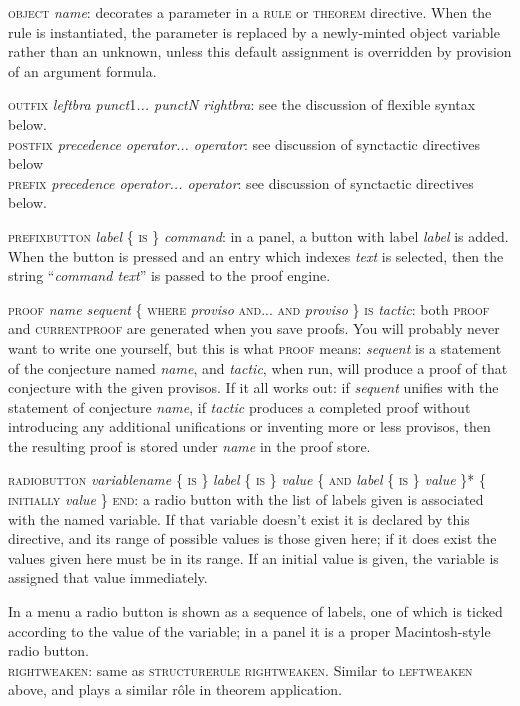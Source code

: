 \textsc{object} \textit{name}: decorates a parameter in a \textsc{rule} or \textsc{theorem} directive. When the rule is instantiated, the parameter is replaced by a newly-minted object variable rather than an unknown, unless this default assignment is overridden by provision of an argument formula.


\textsc{outfix} \textit{leftbra punct}1\textit{... punctN rightbra}: see the discussion of flexible syntax below.\\
\textsc{postfix} \textit{precedence operator... operator}: see discussion of synctactic directives below\\
\textsc{prefix} \textit{precedence operator... operator}: see discussion of synctactic directives below.


\textsc{prefixbutton} \textit{label} \{ \textsc{is} \} \textit{command}: in a panel, a button with label \textit{label} is added. When the button is pressed and an entry which indexes \textit{text} is selected, then the string ``\textit{command text}'' is passed to the proof engine.


\textsc{proof} \textit{name sequent} \{ \textsc{where} \textit{proviso} \textsc{and... and} \textit{proviso} \textsc{\} is} \textit{tactic}: both \textsc{proof} and \textsc{currentproof} are generated when you save proofs. You will probably never want to write one yourself, but this is what \textsc{proof} means: \textit{sequent} is a statement of the conjecture named \textit{name}, and \textit{tactic}, when run, will produce a proof of that conjecture with the given provisos. If it all works out: if \textit{sequent} unifies with the statement of conjecture \textit{name}, if \textit{tactic} produces a completed proof without introducing any additional unifications or inventing more or less provisos, then the resulting proof is stored under \textit{name} in the proof store.


\textsc{radiobutton} \textit{variablename} \{ \textsc{is} \} \textit{label} \{ \textsc{is} \} \textit{value} \{ \textsc{and} \textit{label} \{ \textsc{is} \} \textit{value} \}* \{ \textsc{initially} \textit{value} \} \textsc{end}: a radio button with the list of labels given is associated with the named variable. If that variable doesn't exist it is declared by this directive, and its range of possible values is those given here; if it does exist the values given here must be in its range. If an initial value is given, the variable is assigned that value immediately.


\tab In a menu a radio button is shown as a sequence of labels, one of which is ticked according to the value of the variable; in a panel it is a proper Macintosh-style radio button.\\
\textsc{rightweaken}: same as \textsc{structurerule} \textsc{rightweaken}{\large .} Similar to \textsc{leftweaken} above, and plays a similar r\^{o}le in theorem application.



